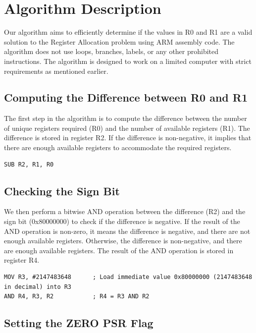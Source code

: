 \section{Algorithm Description}

Our algorithm aims to efficiently determine if the values in R0 and R1 are a valid solution to the Register Allocation problem using ARM assembly code. The algorithm does not use loops, branches, labels, or any other prohibited instructions. The algorithm is designed to work on a limited computer with strict requirements as mentioned earlier.

\subsection{Computing the Difference between R0 and R1}

The first step in the algorithm is to compute the difference between the number of unique registers required (R0) and the number of available registers (R1). The difference is stored in register R2. If the difference is non-negative, it implies that there are enough available registers to accommodate the required registers.

\begin{verbatim}
SUB R2, R1, R0
\end{verbatim}

\subsection{Checking the Sign Bit}

We then perform a bitwise AND operation between the difference (R2) and the sign bit (0x80000000) to check if the difference is negative. If the result of the AND operation is non-zero, it means the difference is negative, and there are not enough available registers. Otherwise, the difference is non-negative, and there are enough available registers. The result of the AND operation is stored in register R4.

\begin{verbatim}
MOV R3, #2147483648      ; Load immediate value 0x80000000 (2147483648 in decimal) into R3
AND R4, R3, R2           ; R4 = R3 AND R2
\end{verbatim}

\subsection{Setting the ZERO PSR Flag}

